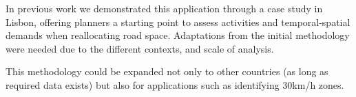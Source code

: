 \documentclass[review, 3p,
authoryear]{elsarticle} %
\begin{document}
In previous work we demonstrated this application through a case study
in Lisbon, offering planners a starting point to assess activities and
temporal-spatial demands when reallocating road space. Adaptations from
the initial methodology were needed due to the different contexts, and
scale of analysis.

This methodology could be expanded not only to other countries (as long
as required data exists) but also for applications such as identifying
30km/h zones.


\end{document}
